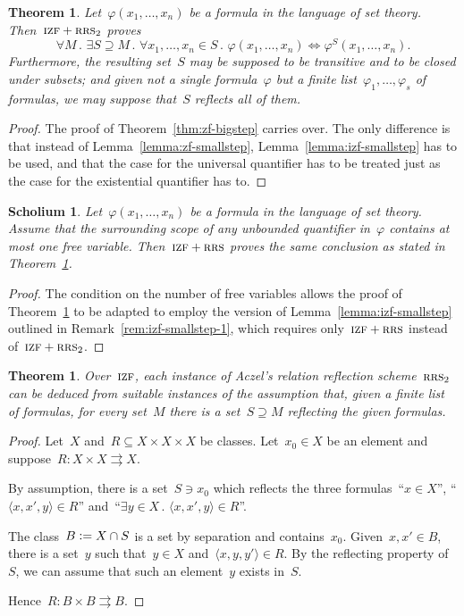 \documentclass[oneside,reqno]{amsart}
\theoremstyle{definition}
\theoremstyle{plain}
\newtheorem{thm}[defn]{Theorem}
\newtheorem{scholium}[defn]{Scholium}
\theoremstyle{remark}
\newcommand{\defeq}{\vcentcolon=}
\renewcommand{\_}{\mathpunct{.}\,}
\newcommand{\?}{\,{:}\,}
\newcommand{\IZF}{\textsc{izf}}
\newcommand{\RRS}{\textsc{rrs}}
\begin{document}
\begin{thm}\label{thm:izf-bigstep}
Let~$\varphi(x_1,\ldots,x_n)$ be a formula in the language of set
theory. Then~$\IZF+\RRS_2$ proves
\[ \forall M\_
  \exists S \supseteq M\_
  \forall x_1,\ldots,x_n \in S\_
  \varphi(x_1,\ldots,x_n) \Leftrightarrow \varphi^S(x_1,\ldots,x_n). \]
Furthermore, the resulting set~$S$ may be supposed to be transitive and to be closed
under subsets; and given not a single formula~$\varphi$ but a finite
list~$\varphi_1,\ldots,\varphi_s$ of formulas, we may suppose that~$S$ reflects
all of them.
\end{thm}

\begin{proof}The proof of Theorem~\ref{thm:zf-bigstep} carries over. The only
difference is that instead of Lemma~\ref{lemma:zf-smallstep},
Lemma~\ref{lemma:izf-smallstep} has to be used, and that the case for the
universal quantifier has to be treated just as the case for the existential
quantifier has to.\end{proof}

\begin{scholium}\label{scholium:izf-bigstep-1}
Let~$\varphi(x_1,\ldots,x_n)$ be a formula in the language of set
theory. Assume that the surrounding scope of
any unbounded quantifier in~$\varphi$ contains at most one free variable.
Then~$\IZF+\RRS$ proves the same conclusion as stated in
Theorem~\ref{thm:izf-bigstep}.
\end{scholium}

\begin{proof}The condition on the number of free variables allows the proof of
Theorem~\ref{thm:izf-bigstep} to be adapted to employ the version of
Lemma~\ref{lemma:izf-smallstep} outlined in Remark~\ref{rem:izf-smallstep-1},
which requires only~$\IZF+\RRS$ instead of~$\IZF+\RRS_2$.
\end{proof}

\begin{thm}\label{thm:refl-entails-rrs2}
Over~$\IZF$, each instance of Aczel's relation reflection scheme~$\RRS_2$ can be
deduced from suitable instances of the assumption that, given a finite list
of formulas, for every set~$M$ there is a set~$S \supseteq M$ reflecting the
given formulas.
\end{thm}

\begin{proof}Let~$X$ and~$R \subseteq X \times X \times X$ be classes. Let~$x_0 \in X$
be an element and suppose~$R : X \times X \rightrightarrows X$.

By assumption, there is a set~$S \ni x_0$ which reflects the three
formulas~``$x \in X$'', ``$\langle x,x',y \rangle \in R$'' and~``$\exists y \in X\_ \langle
x,x',y \rangle \in R$''.

The class~$B \defeq X \cap S$ is a set by separation and contains~$x_0$.
Given~$x,x' \in B$, there is a set~$y$ such that~$y \in X$ and~$\langle x,y,y'
\rangle \in R$. By the reflecting property of~$S$, we can assume that such an
element~$y$ exists in~$S$.

Hence~$R : B \times B \rightrightarrows B$.
\end{proof}
\end{document}
